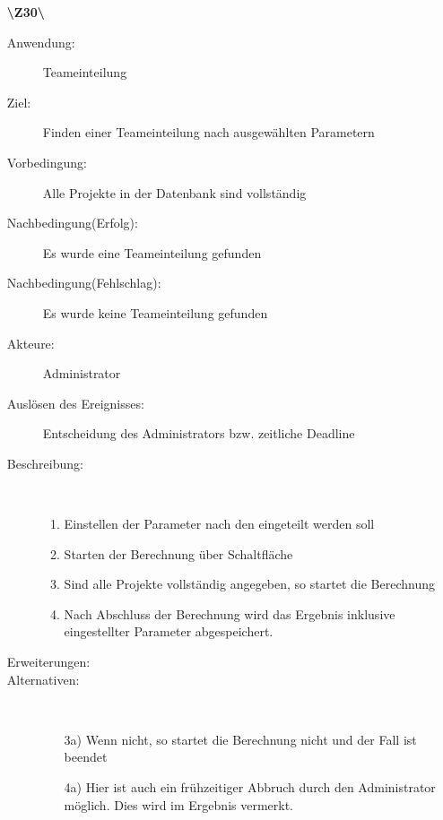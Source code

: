\documentclass[a4paper]{article}
\begin{document}
\begin{enumerate}
  \item[\textbf{\textbackslash Z30\textbackslash}] \begin{description}
  \item[Anwendung:] Teameinteilung
  \item[Ziel:] Finden einer Teameinteilung nach ausgewählten Parametern
  	\item[Vorbedingung:] Alle Projekte in der Datenbank sind vollständig
  	\item[Nachbedingung(Erfolg):] Es wurde eine Teameinteilung gefunden
  	\item[Nachbedingung(Fehlschlag):] Es wurde keine Teameinteilung gefunden
  	\item[Akteure:] Administrator
  	\item[Auslösen des Ereignisses:] Entscheidung des Administrators bzw.
  	zeitliche Deadline
  	\item[Beschreibung:]~
  	\begin{enumerate}[1.]
  	  \item Einstellen der Parameter nach den eingeteilt werden soll
  	  \item Starten der Berechnung über Schaltfläche
  	  \item Sind alle Projekte vollständig angegeben, so startet die Berechnung
  	  \item Nach Abschluss der Berechnung wird das Ergebnis inklusive
  	  eingestellter Parameter abgespeichert.
  	\end{enumerate}
  	\item[Erweiterungen:]
  	\item[Alternativen:] ~
  	\begin{enumerate}
  	  \item[3a)] Wenn nicht, so startet die Berechnung nicht und der Fall ist
  	  beendet
  	  \item[4a)] Hier ist auch ein frühzeitiger Abbruch durch den Administrator
  	  möglich. Dies wird im Ergebnis vermerkt.
  	 \end{enumerate}  
  \end{description}
  \pagebreak
  

\end{enumerate}
\end{document}
